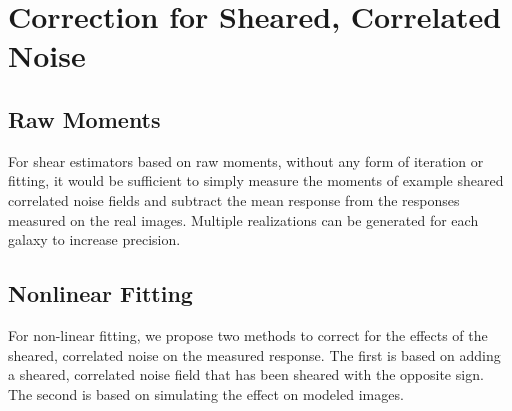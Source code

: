 \documentclass[usegraphicx,usenatbib]{mn2e}
\begin{document}
\begin{comment}
\subsection{Expected Level of Contamination}

I think the following is not correct.

The correlated noise is produced by de-convolving and re-convolving by the psf,
so it may be correlated with the PSF ellipticity at some level.  Let's assume
the induced ellipticity is $f \times e^{PSF}$ in the absence of shearing, with
$f$ small.  We expect this to cancel in the response calculation, due to the
subtraction, but add to the estimator $E$.  This should, however, be
partly dealt with by subtracting $R^{PSF}$ (see below).

If we introduce shearing, then the sheared noise will cancel in the estimator
$E$ but not the response.

This sheared part of the correlated noise is suppressed by a factor of
$\gamma$, but in forming the derivative another factor of $1/\gamma$ is
applied.  Thus we expect the overall contamination $R_\eta$ to be of
the order $f \times e^{PSF}$.

\end{comment}

\section{Correction for Sheared, Correlated Noise} \label{sec:corr}

\subsection{Raw Moments}

For shear estimators based on raw moments, without any form of iteration or
fitting, it would be sufficient to simply measure the moments of example
sheared correlated noise fields and subtract the mean response from the
responses measured on the real images.  Multiple realizations can be generated
for each galaxy to increase precision.

\subsection{Nonlinear Fitting}

For non-linear fitting, we propose two methods to correct for the effects of
the sheared, correlated noise on the measured response.  The first is based on
adding a sheared, correlated noise field that has been sheared with the
opposite sign.  The second is based on simulating the effect on modeled images.
\end{document}

